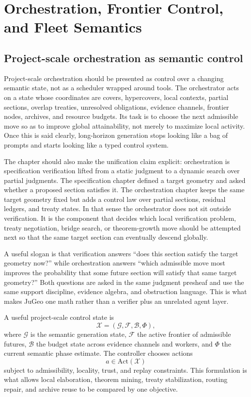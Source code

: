 \documentclass[11pt]{report}
\begin{document}
\part{Orchestration, Frontier Control, and Fleet Semantics}
\chapter{Project-scale orchestration as semantic control}
Project-scale orchestration should be presented as control over a changing semantic state, not as a scheduler wrapped around tools. The orchestrator acts on a state whose coordinates are covers, hypercovers, local contexts, partial sections, overlap treaties, unresolved obligations, evidence channels, frontier nodes, archives, and resource budgets. Its task is to choose the next admissible move so as to improve global attainability, not merely to maximize local activity. Once this is said clearly, long-horizon generation stops looking like a bag of prompts and starts looking like a typed control system.

The chapter should also make the unification claim explicit: orchestration is specification verification lifted from a static judgment to a dynamic search over partial judgments. The specification chapter defined a target geometry and asked whether a proposed section satisfies it. The orchestration chapter keeps the same target geometry fixed but adds a control law over partial sections, residual ledgers, and treaty states. In that sense the orchestrator does not sit outside verification. It is the component that decides which local verification problem, treaty negotiation, bridge search, or theorem-growth move should be attempted next so that the same target section can eventually descend globally.

A useful slogan is that verification answers ``does this section satisfy the target geometry now?'' while orchestration answers ``which admissible move most improves the probability that some future section will satisfy that same target geometry?'' Both questions are asked in the same judgment presheaf and use the same support discipline, evidence algebra, and obstruction language. This is what makes JuGeo one math rather than a verifier plus an unrelated agent layer.

A useful project-scale control state is
\[
\mathcal{X} = (\mathcal{G}, \mathcal{F}, \mathcal{B}, \Phi),
\]
where $\mathcal{G}$ is the semantic generation state, $\mathcal{F}$ the active frontier of admissible futures, $\mathcal{B}$ the budget state across evidence channels and workers, and $\Phi$ the current semantic phase estimate. The controller chooses actions
\[
a \in \mathrm{Act}(\mathcal{X})
\]
subject to admissibility, locality, trust, and replay constraints. This formulation is what allows local elaboration, theorem mining, treaty stabilization, routing repair, and archive reuse to be compared by one objective.
\end{document}

